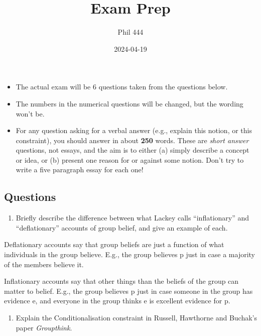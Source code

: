 \documentclass[
  12pt,
  letterpaper,
  DIV=11,
  numbers=noendperiod]{scrartcl}
\title{Exam Prep}
\author{Phil 444}
\date{2024-04-19}
\providecommand{\tightlist}{%
  \setlength{\itemsep}{0pt}\setlength{\parskip}{0pt}}\usepackage{longtable,booktabs,array}
\begin{document}
\maketitle

\begin{itemize}
\tightlist
\item
  The actual exam will be 6 questions taken from the questions below.
\item
  The numbers in the numerical questions will be changed, but the
  wording won't be.
\item
  For any question asking for a verbal answer (e.g., explain this
  notion, or this constraint), you should answer in about \textbf{250}
  words. These are \emph{short answer} questions, not essays, and the
  aim is to either (a) simply describe a concept or idea, or (b) present
  one reason for or against some notion. Don't try to write a five
  paragraph essay for each one!
\end{itemize}

\subsection*{Questions}\label{questions}

\begin{enumerate}
\def\labelenumi{\arabic{enumi}.}
\tightlist
\item
  Briefly describe the difference between what Lackey calls
  ``inflationary'' and ``deflationary'' accounts of group belief, and
  give an example of each.
\end{enumerate}

Deflationary accounts say that group beliefs are just a function of what
individuals in the group believe. E.g., the group believes p just in
case a majority of the members believe it.

Inflationary accounts say that other things than the beliefs of the
group can matter to belief. E.g., the group believes p just in case
someone in the group has evidence e, and everyone in the group thinks e
is excellent evidence for p.

\begin{enumerate}
\def\labelenumi{\arabic{enumi}.}
\setcounter{enumi}{1}
\tightlist
\item
  Explain the Conditionalisation constraint in Russell, Hawthorne and
  Buchak's paper \emph{Groupthink}.
\end{enumerate}
\end{document}
